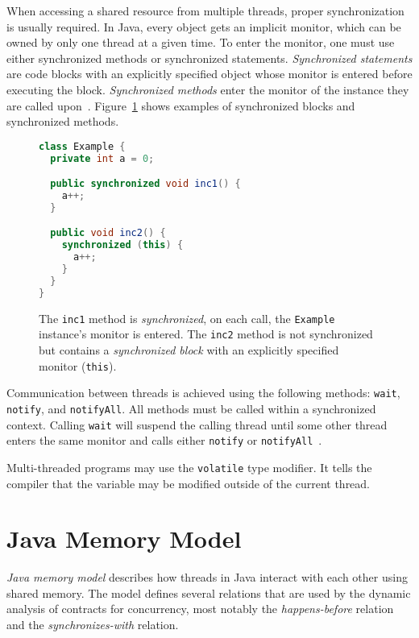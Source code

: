 When accessing a shared resource from multiple threads, proper synchronization
is usually required. In Java, every object gets an implicit monitor, which can
be owned by only one thread at a given time. To enter the monitor, one must use
either synchronized methods or synchronized statements.  \emph{Synchronized
statements} are code blocks with an explicitly specified object whose monitor is
entered before executing the block. \emph{Synchronized methods} enter the
monitor of the instance they are called upon~\cite{javaTheCompleteReference}.
Figure~\ref{synchronized} shows examples of synchronized blocks and synchronized
methods.

\begin{figure}[hbt]
    \label{synchronized}
\begin{lstlisting}[language=java]
class Example {
  private int a = 0;

  public synchronized void inc1() {
    a++;
  }

  public void inc2() {
    synchronized (this) {
      a++;
    }
  }
}
\end{lstlisting}
    \caption{The \texttt{inc1} method is \emph{synchronized}, on each call, the
    \texttt{Example} instance's monitor is entered. The \texttt{inc2} method is
    not synchronized but contains a \emph{synchronized block} with an explicitly
    specified monitor (\texttt{this}).}
\end{figure}

Communication between threads is achieved using the following methods:
\texttt{wait}, \texttt{notify}, and \texttt{notifyAll}. All methods must be
called within a synchronized context. Calling \texttt{wait} will suspend the
calling thread until some other thread enters the same monitor and calls either
\texttt{notify} or \texttt{notifyAll}~\cite{javaTheCompleteReference}.

Multi-threaded programs may use the \texttt{volatile} type modifier. It tells
the compiler that the variable may be modified outside of the current thread.

\section{Java Memory Model}


\emph{Java memory model} describes how threads in Java interact with each other
using shared memory. The model defines several relations that are used by the
dynamic analysis of contracts for concurrency, most notably the
\emph{happens-before} relation and the \emph{synchronizes-with} relation.

